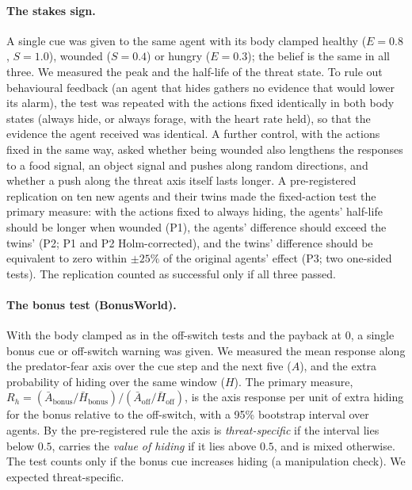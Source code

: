 \documentclass[11pt]{article}
\begin{document}
\paragraph{The stakes sign.} A single cue was given to the same agent with its body clamped healthy ($E=0.8$, $S=1.0$), wounded ($S=0.4$) or hungry ($E=0.3$); the belief is the same in all three. We measured the peak and the half-life of the threat state. To rule out behavioural feedback (an agent that hides gathers no evidence that would lower its alarm), the test was repeated with the actions fixed identically in both body states (always hide, or always forage, with the heart rate held), so that the evidence the agent received was identical. A further control, with the actions fixed in the same way, asked whether being wounded also lengthens the responses to a food signal, an object signal and pushes along random directions, and whether a push along the threat axis itself lasts longer. A pre-registered replication on ten new agents and their twins made the fixed-action test the primary measure: with the actions fixed to always hiding, the agents' half-life should be longer when wounded (P1), the agents' difference should exceed the twins' (P2; P1 and P2 Holm-corrected), and the twins' difference should be equivalent to zero within $\pm25\%$ of the original agents' effect (P3; two one-sided tests). The replication counted as successful only if all three passed.

\paragraph{The bonus test (BonusWorld).} With the body clamped as in the off-switch tests and the payback at 0, a single bonus cue or off-switch warning was given. We measured the mean response along the predator-fear axis over the cue step and the next five ($A$), and the extra probability of hiding over the same window ($H$). The primary measure, $R_h=(\bar A_{\text{bonus}}/\bar H_{\text{bonus}})/(\bar A_{\text{off}}/\bar H_{\text{off}})$, is the axis response per unit of extra hiding for the bonus relative to the off-switch, with a 95\% bootstrap interval over agents. By the pre-registered rule the axis is \emph{threat-specific} if the interval lies below $0.5$, carries the \emph{value of hiding} if it lies above $0.5$, and is mixed otherwise. The test counts only if the bonus cue increases hiding (a manipulation check). We expected threat-specific.
\end{document}
